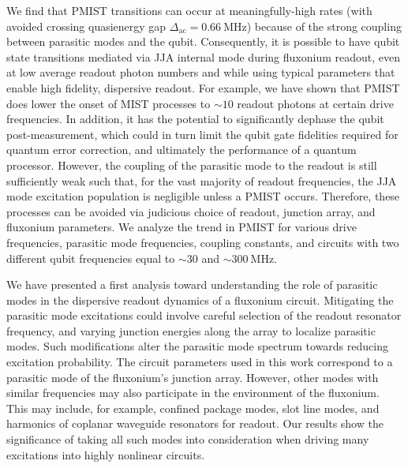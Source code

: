 \documentclass[%
reprint,
superscriptaddress,
 amsmath,amssymb,
 aps,
 prx,
longbibliography,
floatfix,
]{revtex4-2}
\begin{document}
We find that PMIST transitions can occur at meaningfully-high rates (with avoided crossing quasienergy gap $\Delta_{\textrm{ac}}=0.66 \ \textrm{MHz}$) because of the strong coupling between  parasitic modes and the qubit. Consequently, it is possible to have qubit state transitions mediated via JJA internal mode during fluxonium readout, even at low average readout photon numbers and while using typical parameters that enable high fidelity, dispersive readout. For example, we have shown that PMIST does lower the onset of MIST processes to $\sim 10$ readout photons at certain drive frequencies. In addition, it has the potential to significantly dephase the qubit post-measurement, which could in turn limit the qubit gate fidelities required for quantum error correction, and ultimately the performance of a quantum processor. However, the coupling of the parasitic mode to the readout is still sufficiently weak such that, for the vast majority of readout frequencies, the JJA mode excitation population is negligible unless a PMIST occurs. Therefore, these processes can be avoided via judicious choice of readout, junction array, and fluxonium parameters.
We analyze the trend in PMIST for various drive frequencies, parasitic mode frequencies, coupling constants, and circuits with two different qubit frequencies equal to $\sim 30$ and $\sim 300 \ \mathrm{MHz}$. 


We have presented a first analysis toward understanding the role of parasitic modes in the dispersive readout dynamics of a fluxonium circuit. Mitigating the parasitic mode excitations could involve careful selection of the readout resonator frequency, and varying junction energies along the array to localize parasitic modes. Such modifications alter the parasitic mode spectrum towards reducing excitation probability. The circuit parameters used in this work correspond to a parasitic mode of the fluxonium's junction array. However, other modes with similar frequencies may also participate in the environment of the fluxonium. This may include, for example, confined package modes, slot line modes, and harmonics of coplanar waveguide resonators for readout. Our results show the significance of taking all such modes into consideration when driving many excitations into highly nonlinear circuits.  
\end{document}
